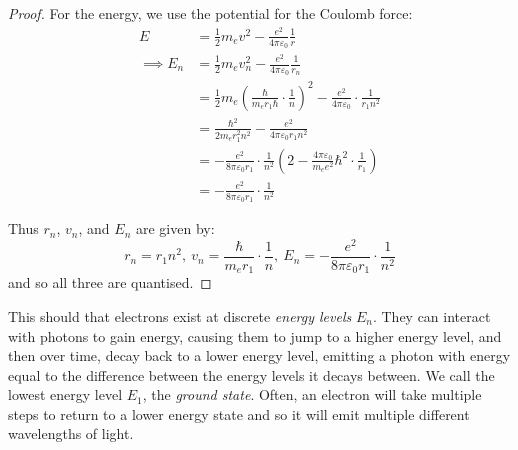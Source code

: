 \documentclass[../main.tex]{subfiles}
\begin{document}
\begin{proof}
  For the energy, we use the potential for the Coulomb force:
  \begin{align*}
    E &= \frac{1}{2} m_e v^2 - \frac{e^2}{4 \pi \varepsilon_0} \frac{1}{r} \\
    \implies E_n &= \frac{1}{2} m_e v^2_n - \frac{e^2}{4 \pi \varepsilon_0} \frac{1}{r_n} \\
                 &= \frac{1}{2} m_e \left(\frac{\hbar}{m_e r_1 \hbar} \cdot \frac{1}{n}\right)^2 - \frac{e^2}{4 \pi \varepsilon_0} \cdot \frac{1}{r_1 n^2} \\
                 &= \frac{\hbar^2}{2m_e r^2_1 n^2} - \frac{e^2}{4 \pi \varepsilon_0 r_1 n^2} \\
                 &= -\frac{e^2}{8 \pi \varepsilon_0 r_1} \cdot \frac{1}{n^2}\left(2 - \frac{4\pi \varepsilon_0}{m_e e^2}\hbar^2 \cdot \frac{1}{r_1}\right) \\
                 &= -\frac{e^2}{8 \pi \varepsilon_0 r_1} \cdot \frac{1}{n^2}
  \end{align*}

  Thus $r_n$, $v_n$, and $E_n$ are given by:
  \[
    r_n = r_1n^2 ,\ v_n = \frac{\hbar}{m_e r_1} \cdot \frac{1}{n},\ E_n = -\frac{e^2}{8 \pi \varepsilon_0 r_1} \cdot \frac{1}{n^2}
  \]
  and so all three are quantised.
\end{proof}
This should that electrons exist at discrete \textit{energy levels} $E_n$.
They can interact with photons to gain energy, causing them to jump to a higher energy level, and then over time, decay back to a lower energy level, emitting a photon with energy equal to the difference between the energy levels it decays between.
We call the lowest energy level $E_1$, the \textit{ground state}.
Often, an electron will take multiple steps to return to a lower energy state and so it will emit multiple different wavelengths of light.
\end{document}
